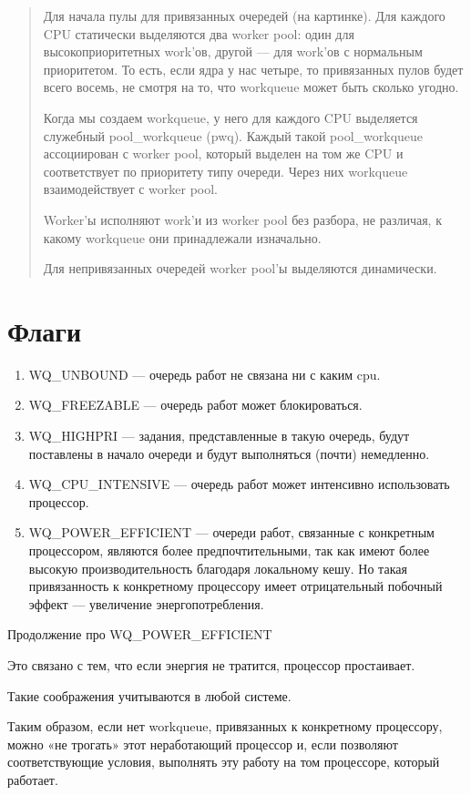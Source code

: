\begin{quote}
	Для начала пулы для привязанных очередей (на картинке). Для каждого CPU статически выделяются два worker pool: один для высокоприоритетных work’ов, другой — для work’ов с нормальным приоритетом. То есть, если ядра у нас четыре, то привязанных пулов будет всего восемь, не смотря на то, что workqueue может быть сколько угодно.

Когда мы создаем workqueue, у него для каждого CPU выделяется служебный pool\_workqueue (pwq). Каждый такой pool\_workqueue ассоциирован с worker pool, который выделен на том же CPU и соответствует по приоритету типу очереди. Через них workqueue взаимодействует с worker pool.

Worker’ы исполняют work’и из worker pool без разбора, не различая, к какому workqueue они принадлежали изначально.

Для непривязанных очередей worker pool’ы выделяются динамически.
\end{quote}

\section{Флаги}

\begin{enumerate}
	\item WQ\_UNBOUND --- очередь работ не связана ни с каким cpu.
	\item WQ\_FREEZABLE --- очередь работ может блокироваться.
	\item WQ\_HIGHPRI --- задания, представленные в такую очередь, будут поставлены в начало очереди и будут выполняться (почти) немедленно.
	\item WQ\_CPU\_INTENSIVE --- очередь работ может интенсивно использовать процессор.
	\item WQ\_POWER\_EFFICIENT --- очереди работ, связанные с конкретным процессором, являются более предпочтительными, так как имеют более высокую производительность благодаря локальному кешу. Но такая привязанность к конкретному процессору имеет отрицательный побочный эффект --- увеличение энергопотребления.
\end{enumerate}

Продолжение про WQ\_POWER\_EFFICIENT

Это связано с тем, что если энергия не тратится, процессор простаивает.

Такие соображения учитываются в любой системе.

Таким образом, если нет workqueue, привязанных к конкретному процессору, можно «не трогать» этот неработающий процессор и, если позволяют соответствующие условия, выполнять эту работу на том процессоре, который работает.

